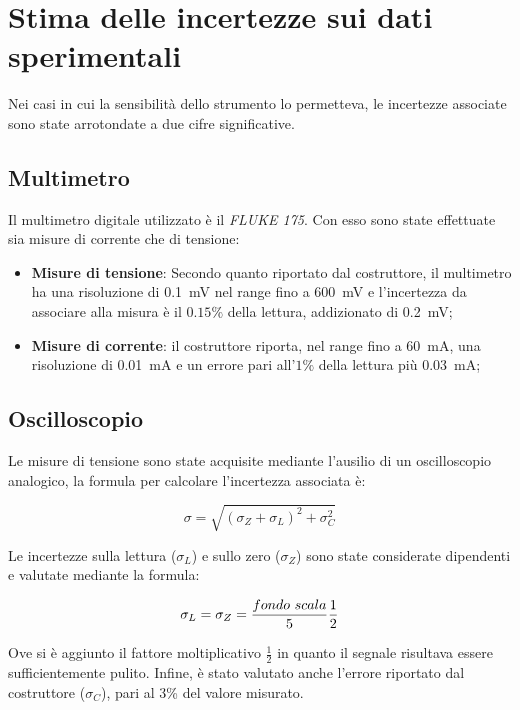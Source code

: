 \documentclass[../main.tex]{subfiles}
\begin{document}
\section{Stima delle incertezze sui dati sperimentali}
  \label{sec:propagazione-errori-misure}
  Nei casi in cui la sensibilità dello strumento lo permetteva, le incertezze associate sono
  state arrotondate a due cifre significative.
  \subsection*{Multimetro}
    Il multimetro digitale utilizzato è il \textit{FLUKE 175}.
    Con esso sono state effettuate sia misure di corrente che di tensione:
    \begin{itemize}
      \item \textbf{Misure di tensione}: Secondo quanto riportato dal costruttore, il multimetro
      ha una risoluzione di 0.1~mV nel range fino a 600~mV e l'incertezza da associare alla misura
      è il $0.15\%$ della lettura, addizionato di 0.2~mV;
      \item \textbf{Misure di corrente}: il costruttore riporta, nel range fino a
      60~mA, una risoluzione di 0.01~mA e un errore pari all'$1\%$ della
      lettura più 0.03~mA;
    \end{itemize}

  \subsection*{Oscilloscopio}
    \noindent Le misure di tensione sono state acquisite mediante l'ausilio di un oscilloscopio analogico,
    la formula per calcolare l'incertezza associata è:

    \begin{equation*}
      \sigma = \sqrt {\left( \sigma_Z + \sigma_L  \right)^2 + \sigma_C^2}
    \end{equation*}

    \vspace{0.1cm}
    \noindent Le incertezze sulla lettura ($\sigma_L$) e sullo zero ($\sigma_Z$) sono state considerate dipendenti
    e valutate mediante la formula:
    \vspace{0.1cm}


    \begin{equation*}
      \sigma_L = \sigma_Z = \frac{fondo\textnormal{ }scala}{5} \frac{1}{2}
    \end{equation*}

    \noindent Ove si è aggiunto il fattore moltiplicativo $\frac{1}{2}$ in quanto il segnale risultava
    essere sufficientemente pulito.\newline\newline
    \noindent Infine, è stato valutato anche l'errore riportato dal costruttore ($\sigma_C$), pari
    al 3\% del valore misurato.
\end{document}
